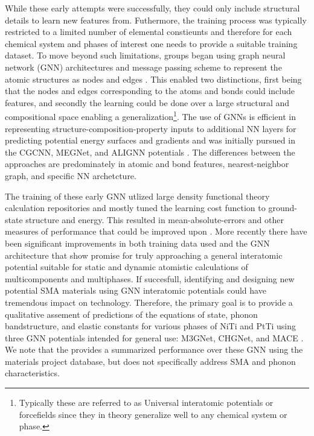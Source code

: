 \documentclass[preprint]{elsarticle}
\begin{document}
While these early attempts were successfully, they could only include structural details to learn new features from. Futhermore, the training process was typically restricted to a limited number of elemental constieunts and therefore for each chemical system and phases of interest one needs to provide a suitable training dataset. To move beyond such limitations, groups began using graph neural network (GNN) architectures and message passing scheme to represent the atomic structures as nodes and edges \cite{Reiser2022}. This enabled two distinctions, first being that the nodes and edges corresponding to the atoms and bonds could include features, and secondly the learning could be done over a large structural and compositional space enabling a generalization\footnote{Typically these are referred to as Universal interatomic potentials or forcefields since they in theory generalize well to any chemical system or phase.}. The use of GNNs is efficient in representing structure-composition-property inputs to additional NN layers for predicting potential energy surfaces and gradients and was initially pursued in the CGCNN, MEGNet, and ALIGNN potentials \cite{Choudhary2021,Chen2019,Xie2018}. The differences between the approaches are predominately in atomic and bond features, nearest-neighbor graph, and specific NN archetcture. \par

The training of these early GNN utlized large density functional theory calculation repositories and mostly tuned the learning cost function to ground-state structure and energy. This resulted in mean-absolute-errors and other measures of performance that could be improved upon \cite{Riebesell2023}. More recently there have been significant improvements in both training data used and the GNN architecture that show promise for truly approaching a general interatomic potential suitable for static and dynamic atomistic calculations of multicomponents and multiphases. If succesfull, identifying and designing new potential SMA materials using GNN interatomic potentials could have tremendous impact on technology. Therefore, the primary goal is to provide a qualitative assement of predictions of the equations of state, phonon bandstructure, and elastic constants for various phases of NiTi and PtTi using three GNN potentials intended for general use: M3GNet, CHGNet, and MACE \cite{Chen2022,Deng2023,Batatia2022}. We note that the \citet{Riebesell2023} provides a summarized performance over these GNN using the materials project database, but does not specifically address SMA and phonon characteristics. \par   
\end{document}

